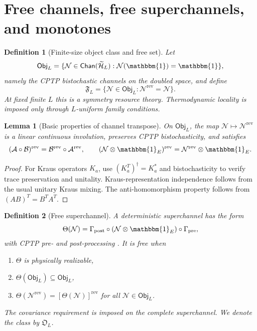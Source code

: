 \documentclass[reprint,amsmath,amssymb,aps,nofootinbib]{revtex4-2}
\newtheorem{definition}{Definition}
\newtheorem{lemma}{Lemma}
\newcommand{\id}{\mathbbm{1}}
\newcommand{\F}{\mathfrak F}
\newcommand{\FreeOps}{\mathfrak O}
\newcommand{\Chan}{\mathsf{Chan}}
\newcommand{\rev}{\mathrm{rev}}
\begin{document}
\section{Free channels, free superchannels, and monotones}
\label{sec:qrt}

\begin{definition}[Finite-size object class and free set]
Let
\begin{equation}
\mathsf{Obj}_L=\{\mathcal N\in\Chan(\widetilde{\mathcal H}_L):\mathcal N(\id)=\id\},
\end{equation}
namely the CPTP bistochastic channels on the doubled space, and define
\begin{equation}
\boxed{\F_L=\{\mathcal N\in\mathsf{Obj}_L:\mathcal N^{\rev}=\mathcal N\}.}
\end{equation}
At fixed finite $L$ this is a symmetry resource theory. Thermodynamic locality is imposed only
through $L$-uniform family conditions.
\end{definition}

\begin{lemma}[Basic properties of channel transpose]
On $\mathsf{Obj}_L$, the map $\mathcal N\mapsto\mathcal N^{\rev}$ is a linear continuous involution,
preserves CPTP bistochasticity, and satisfies
\begin{equation}
(\mathcal A\circ\mathcal B)^{\rev}
=\mathcal B^{\rev}\circ\mathcal A^{\rev},
\qquad
(\mathcal N\otimes\id_E)^{\rev}
=\mathcal N^{\rev}\otimes\id_E.
\end{equation}
\end{lemma}

\begin{proof}
For Kraus operators $K_a$, use $(K_a^T)^\dagger=K_a^*$ and bistochasticity to verify trace
preservation and unitality. Kraus-representation independence follows from the usual unitary
Kraus mixing. The anti-homomorphism property follows from $(AB)^T=B^TA^T$.
\end{proof}

\begin{definition}[Free superchannel]
A deterministic superchannel has the form
\begin{equation}
\Theta(\mathcal N)=\Gamma_{\rm post}\circ(\mathcal N\otimes\id_E)\circ\Gamma_{\rm pre},
\end{equation}
with CPTP pre- and post-processing \cite{ChiribellaSupermap}. It is free when
\begin{enumerate}
\item $\Theta$ is physically realizable,
\item $\Theta(\mathsf{Obj}_L)\subseteq\mathsf{Obj}_L$,
\item $\boxed{\Theta(\mathcal N^{\rev})=[\Theta(\mathcal N)]^{\rev}}$ for all
$\mathcal N\in\mathsf{Obj}_L$.
\end{enumerate}
The covariance requirement is imposed on the complete superchannel. We denote the class by
$\FreeOps_L$.
\end{definition}
\end{document}
